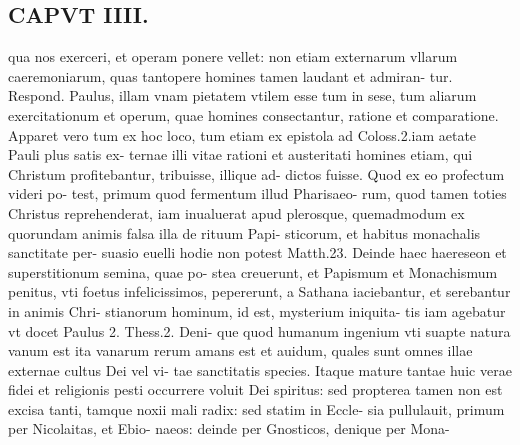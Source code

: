 \documentclass{article}
\begin{document}
\begin{pages}
\section*{CAPVT  IIII. }
\marginpar{[ p.207 ]}\pstart qua nos exerceri, et operam ponere vellet: non etiam externarum vllarum caeremoniarum, quas tantopere homines tamen laudant et admiran- tur. Respond. Paulus, illam vnam pietatem vtilem esse tum in sese, tum aliarum exercitationum et operum, quae homines consectantur, ratione et comparatione. Apparet vero tum ex hoc loco, tum etiam ex epistola ad Coloss.2.iam aetate Pauli plus satis ex- ternae illi vitae rationi et austeritati homines etiam, qui Christum profitebantur, tribuisse, illique ad- dictos fuisse. Quod ex eo profectum videri po- test, primum quod fermentum illud Pharisaeo- rum, quod tamen toties Christus reprehenderat, iam inualuerat apud plerosque, quemadmodum ex quorundam animis falsa illa de rituum Papi- sticorum, et habitus monachalis sanctitate per- suasio euelli hodie non potest Matth.23. Deinde haec haereseon et superstitionum semina, quae po- stea creuerunt, et Papismum et Monachismum penitus, vti foetus infelicissimos, pepererunt, a Sathana iaciebantur, et serebantur in animis Chri- stianorum hominum, id est, mysterium iniquita- tis iam agebatur vt docet Paulus 2. Thess.2. Deni- que quod humanum ingenium vti suapte natura vanum est ita vanarum rerum amans est et auidum, quales sunt omnes illae externae cultus Dei vel vi- tae sanctitatis species. Itaque mature tantae huic verae fidei et religionis pesti occurrere voluit Dei spiritus: sed propterea tamen non est excisa tanti, tamque noxii mali radix: sed statim in Eccle- sia pullulauit, primum per Nicolaitas, et Ebio- naeos: deinde per Gnosticos, denique per Mona-  \pend

\end{pages}
\end{document}
